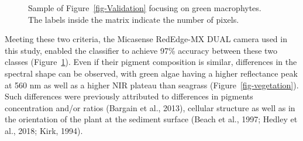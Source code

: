 \documentclass[
  letterpaper,
  11pt,
  english,
  singlespacing,
  headsepline]{MastersDoctoralThesis}
\begin{document}
\begin{spacing}{1.5}
\begin{figure}
\end{figure}%

\begin{figure}


\caption{\label{fig-ValidationGreen}Sample of
Figure~\ref{fig-Validation} focusing on green macrophytes. The labels
inside the matrix indicate the number of pixels.}

\end{figure}%

Meeting these two criteria, the Micasense RedEdge-MX DUAL camera used in
this study, enabled the classifier to achieve 97\% accuracy between
these two classes (Figure~\ref{fig-ValidationGreen}). Even if their
pigment composition is similar, differences in the spectral shape can be
observed, with green algae having a higher reflectance peak at 560 nm as
well as a higher NIR plateau than seagrass
(Figure~\ref{fig-vegetation}). Such differences were previously
attributed to differences in pigments concentration and/or ratios
(Bargain et al., 2013), cellular structure as well as in the orientation
of the plant at the sediment surface (Beach et al., 1997; Hedley et al.,
2018; Kirk, 1994).


\end{spacing}
\end{document}
